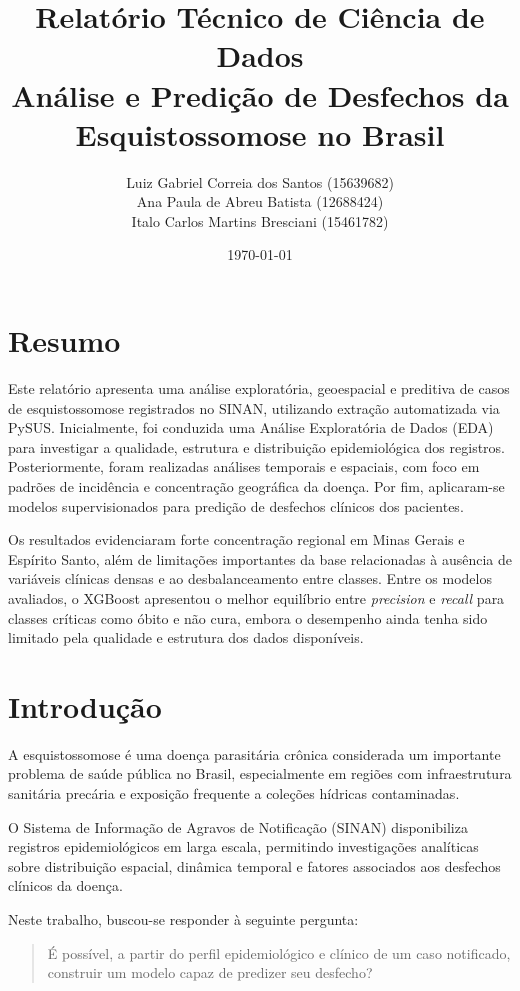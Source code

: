 \documentclass[11pt,a4paper]{article}
\title{
Relatório Técnico de Ciência de Dados \\
Análise e Predição de Desfechos da Esquistossomose no Brasil
}
\author{
Luiz Gabriel Correia dos Santos (15639682) \\
Ana Paula de Abreu Batista (12688424) \\
Italo Carlos Martins Bresciani (15461782)
}
\date{\today}
\begin{document}
\maketitle

\section*{Resumo}

Este relatório apresenta uma análise exploratória, geoespacial e preditiva de casos de esquistossomose registrados no SINAN, utilizando extração automatizada via PySUS. Inicialmente, foi conduzida uma Análise Exploratória de Dados (EDA) para investigar a qualidade, estrutura e distribuição epidemiológica dos registros. Posteriormente, foram realizadas análises temporais e espaciais, com foco em padrões de incidência e concentração geográfica da doença. Por fim, aplicaram-se modelos supervisionados para predição de desfechos clínicos dos pacientes.

Os resultados evidenciaram forte concentração regional em Minas Gerais e Espírito Santo, além de limitações importantes da base relacionadas à ausência de variáveis clínicas densas e ao desbalanceamento entre classes. Entre os modelos avaliados, o XGBoost apresentou o melhor equilíbrio entre \textit{precision} e \textit{recall} para classes críticas como óbito e não cura, embora o desempenho ainda tenha sido limitado pela qualidade e estrutura dos dados disponíveis.

\section{Introdução}

A esquistossomose é uma doença parasitária crônica considerada um importante problema de saúde pública no Brasil, especialmente em regiões com infraestrutura sanitária precária e exposição frequente a coleções hídricas contaminadas.

O Sistema de Informação de Agravos de Notificação (SINAN) disponibiliza registros epidemiológicos em larga escala, permitindo investigações analíticas sobre distribuição espacial, dinâmica temporal e fatores associados aos desfechos clínicos da doença.

Neste trabalho, buscou-se responder à seguinte pergunta:

\begin{quote}
É possível, a partir do perfil epidemiológico e clínico de um caso notificado, construir um modelo capaz de predizer seu desfecho?
\end{quote}
\end{document}
